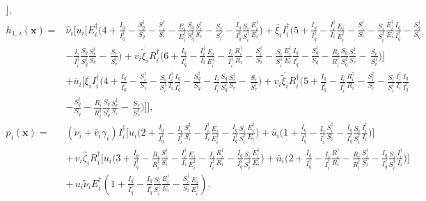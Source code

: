 \documentclass[a4paper]{article}
\begin{document}
\begin{align}
\Bigg],\\
h_{1,\,i}(\mathbf x)=& \hat\nu_i\Bigg[u_i\Big[E^\dagger _i \Big(4 + \frac{I_q}{I^\dagger_q} - \frac{S^\dagger _q}{S_q} -\frac{S^\dagger _i}{S_i} -\frac{E_i}{E^\dagger _i} \frac{S_q}{S^\dagger _q}\frac{S^\dagger _r}{S_r}-\frac{S_r}{S^\dagger _r}-\frac{I_q}{I^\dagger_q} \frac{S_i}{S^\dagger_i} \frac{E^\dagger_i}{E_i}\Big) + \overline{\xi_i} I^\dagger _i\Big(5+\frac{I_q}{I^\dagger _q}- \frac{I^\dagger_i}{I_i}\frac{E_i}{E^\dagger_i}-\frac{S^\dagger _i}{S_i}-\frac{S_i}{S^\dagger _i}\frac{E^\dagger _i}{E_i}\frac{I_q}{I^\dagger _q}-\frac{S^\dagger _q}{S_q}\nonumber\\&-\frac{I_i}{I^\dagger _i}\frac{S_q}{S^\dagger _q}\frac{S^\dagger _r}{S_r}-\,\frac{S_r}{S^\dagger _r}\Big) + v_i\overline{\widetilde\xi_i}R^\dagger_i\Big(6+\frac{I_q}{I^\dagger _q}- \frac{I^\dagger_i}{I_i}\frac{E_i}{E^\dagger_i}-\frac{I_i}{I^\dagger_i}\frac{R^\dagger_i}{R_i}-\frac{S^\dagger _i}{S_i}-\frac{S_i}{S^\dagger _i}\frac{E^\dagger _i}{E_i}\frac{I_q}{I^\dagger _q}-\frac{S^\dagger _q}{S_q}-\frac{R_i}{R^\dagger _i}\frac{S_q}{S^\dagger _q}\frac{S^\dagger _r}{S_r}-\,\frac{S_r}{S^\dagger _r}\Big)\Big] \nonumber\\&+ \bar u_i\Big[\overline{\xi_i} I^\dagger _i\Big(4+\frac{I_q}{I^\dagger _q}- \frac{S^\dagger _i}{S_i}-\frac{S_i}{S^\dagger _i}\frac{I^\dagger _i}{I_i}\frac{I_q}{I^\dagger _q}-\frac{S^\dagger _q}{S_q}-\frac{I_i}{I^\dagger _i}\frac{S_q}{S^\dagger _q}\frac{S^\dagger _r}{S_r}-\,\frac{S_r}{S^\dagger _r}\Big) + v_i\overline{\widetilde\xi_i}R^\dagger_i\Big(5+\frac{I_q}{I^\dagger _q}- \frac{I_i}{I^\dagger_i}\frac{R^\dagger_i}{R_i}-\frac{S^\dagger _i}{S_i}-\frac{S_i}{S^\dagger _i}\frac{I^\dagger _i}{I_i}\frac{I_q}{I^\dagger _q} \nonumber\\&-\frac{S^\dagger _q}{S_q}-\frac{R_i}{R^\dagger _i}\frac{S_q}{S^\dagger _q}\frac{S^\dagger _r}{S_r}-\,\frac{S_r}{S^\dagger _r}\Big)\Big]\Bigg],\\
p_{i}(\mathbf x)=& (\widetilde\nu_i +\bar v_i\gamma_i )I^\dagger _i\Bigg[u_i\Big(2 + \frac{I_q}{I^\dagger _q} - \frac{I_i}{I^\dagger _i} \frac{S^\dagger _i}{S_i} - \frac{I^\dagger_i}{I_i}\frac{E_i}{E^\dagger_i} - \frac{I_q}{I^\dagger _q} \frac{S_i}{S^\dagger _i}\frac{E^\dagger _i}{E_i}\Big) + \bar u_i\Big(1 + \frac{I_q}{I^\dagger _q} - \frac{I_i}{I^\dagger _i} \frac{S^\dagger _i}{S_i} -  \frac{I_q}{I^\dagger _q} \frac{S_i}{S^\dagger _i}\frac{I^\dagger _i}{I_i}\Big)\Bigg]\nonumber\\& +\,v_i\hat\zeta_iR^\dagger _i\Bigg[u_i\Big(3 + \frac{I_q}{I^\dagger _q} - \frac{R_i}{R^\dagger _i} \frac{S^\dagger _i}{S_i} - \frac{I^\dagger_i}{I_i}\frac{E_i}{E^\dagger_i}- \frac{I_i}{I^\dagger_i}\frac{R^\dagger_i}{R_i} - \frac{I_q}{I^\dagger _q} \frac{S_i}{S^\dagger _i}\frac{E^\dagger _i}{E_i}\Big) + \bar u_i\Big(2 + \frac{I_q}{I^\dagger _q} - \frac{I_i}{I^\dagger_i}\frac{R^\dagger_i}{R_i} -\frac{R_i}{R^\dagger _i} \frac{S^\dagger _i}{S_i} -  \frac{I_q}{I^\dagger _q} \frac{S_i}{S^\dagger _i}\frac{I^\dagger _i}{I_i}\Big)\Bigg]\nonumber\\& +\,u_i\widetilde\nu_iE^\dagger_i\left(1 + \frac{I_q}{I^\dagger_q}-\frac{I_q}{I^\dagger_q}\frac{S_i}{S^\dagger_i}\frac{E^\dagger_i}{E_i} - \frac{S^\dagger_i}{S_i} \frac{E_i}{E^\dagger_i}\right).\label{eq:frgmtliap1}

\end{align}
\end{document}
